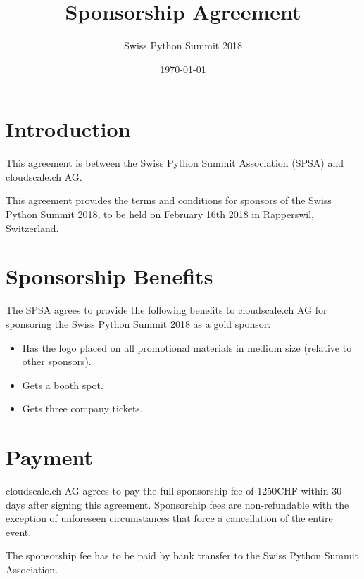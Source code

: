 \documentclass[11pt,enlargefirstpage=true,headlines=4]{scrartcl}
\title{Sponsorship Agreement}
\subtitle{Swiss Python Summit 2018}
\date{\today} %
\begin{document}
    \maketitle

    \section{Introduction}

    This agreement is between the Swiss Python Summit Association (SPSA) and
    cloudscale.ch AG.

    This agreement provides the terms and conditions for sponsors of the Swiss
    Python Summit 2018, to be held on February 16th 2018 in Rapperswil,
    Switzerland.

    \section{Sponsorship Benefits}

    The SPSA agrees to provide the following benefits to cloudscale.ch AG for sponsoring
    the Swiss Python Summit 2018 as a gold sponsor:

    \begin{itemize}
        \item Has the logo placed on all promotional materials in medium size (relative to other sponsors).
        \item Gets a booth spot.
        \item Gets three company tickets.
    \end{itemize}

    \section{Payment}

    cloudscale.ch AG agrees to pay the full sponsorship fee of 1250CHF within 30 days
    after signing this agreement. Sponsorship fees are non‐refundable with the
    exception of unforeseen circumstances that force a cancellation of the entire
    event.

    The sponsorship fee has to be paid by bank transfer to the Swiss Python
    Summit Association.

    \quad
\end{document}
